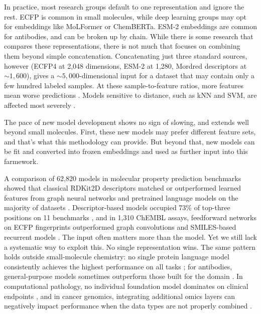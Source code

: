 In practice, most research groups default to one representation and ignore the rest. ECFP is common in small molecules, while deep learning groups may opt for embeddings like MoLFormer or ChemBERTa. ESM-2 embeddings are common for antibodies, and can be broken up by chain. While there is some research that compares these representations, there is not much that focuses on combining them beyond simple concatenation. Concatenating just three standard sources, however (ECFP4 at 2,048 dimensions, ESM-2 at 1,280, Mordred descriptors at ${\sim}1{,}600$), gives a ${\sim}5{,}000$-dimensional input for a dataset that may contain only a few hundred labeled samples. At these sample-to-feature ratios, more features mean worse predictions \citep{Hughes1968, Bellman1961}. Models sensitive to distance, such as kNN and SVM, are affected most severely \citep{FernandezDelgado2014}.

The pace of new model development shows no sign of slowing, and extends well beyond small molecules. First, these new models may prefer different feature sets, and that's what this methodology can provide. But beyond that, new models can be fit and converted into frozen embeddings and used as further input into this farmework. 

A comparison of 62,820 models in molecular property prediction benchmarks showed that classical RDKit2D descriptors matched or outperformed learned features from graph neural networks and pretrained language models on the majority of datasets \citep{Deng2023}. Descriptor-based models occupied 73\% of top-three positions on 11 benchmarks \citep{Jiang2021}, and in 1,310 ChEMBL assays, feedforward networks on ECFP fingerprints outperformed graph convolutions and SMILES-based recurrent models \citep{Mayr2018}. The input often matters more than the model. Yet we still lack a systematic way to exploit this. No single representation wins. The same pattern holds outside small-molecule chemistry: no single protein language model consistently achieves the highest performance on all tasks \citep{Kenlay2024, Schmirler2024}; for antibodies, general-purpose models sometimes outperform those built for the domain \citep{Kenlay2024}. In computational pathology, no individual foundation model dominates on clinical endpoints \citep{ElNahhas2025}, and in cancer genomics, integrating additional omics layers can negatively impact performance when the data types are not properly combined \citep{Steyaert2023}.

